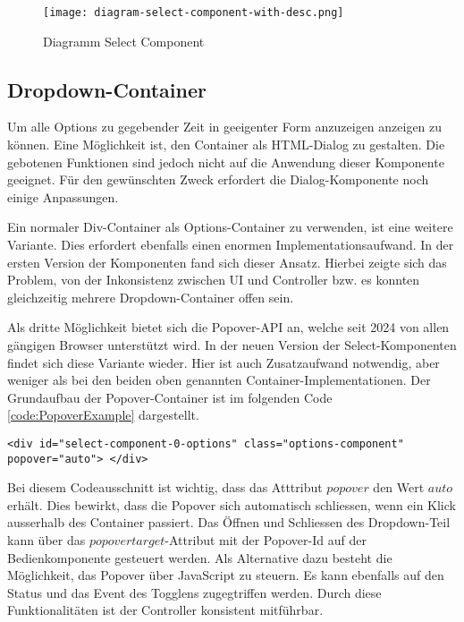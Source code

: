 \begin{figure}[!htb]
    \centering
    \texttt{[image: diagram-select-component-with-desc.png]}
    \caption{Diagramm Select Component}
    \label{Abbildung:DiagramSelectComponent}
\end{figure}


\subsection{Dropdown-Container}

Um alle Options zu gegebender Zeit in geeigenter Form anzuzeigen anzeigen zu können.
Eine Möglichkeit ist, den Container als HTML-Dialog zu gestalten.
Die gebotenen Funktionen sind jedoch nicht auf die Anwendung dieser Komponente geeignet.
Für den gewünschten Zweck erfordert die Dialog-Komponente noch einige Anpassungen.

Ein normaler Div-Container als Options-Container zu verwenden, ist eine weitere Variante.
Dies erfordert ebenfalls einen enormen Implementationsaufwand.
In der ersten Version der Komponenten fand sich dieser Ansatz.
Hierbei zeigte sich das Problem, von der Inkonsistenz zwischen UI und Controller bzw. es konnten gleichzeitig mehrere Dropdown-Container offen sein.

Als dritte Möglichkeit bietet sich die Popover-API an, welche seit 2024 von allen gängigen Browser unterstützt wird.
In der neuen Version der Select-Komponenten findet sich diese Variante wieder.
Hier ist auch Zusatzaufwand notwendig, aber weniger als bei den beiden oben genannten Container-Implementationen.
Der Grundaufbau der Popover-Container ist im folgenden Code \ref{code:PopoverExample} dargestellt.

\begin{lstlisting}[language = html5, caption = Popover-Container Beispiel, label = code:PopoverExample]
<div id="select-component-0-options" class="options-component" popover="auto"> </div>
\end{lstlisting}

Bei diesem Codeausschnitt ist wichtig, dass das Atttribut $popover$ den Wert $auto$ erhält.
Dies bewirkt, dass die Popover sich automatisch schliessen, wenn ein Klick ausserhalb des Container passiert.
Das Öffnen und Schliessen des Dropdown-Teil kann über das $popovertarget$-Attribut mit der Popover-Id auf der Bedienkomponente gesteuert werden.
Als Alternative dazu besteht die Möglichkeit, das Popover über JavaScript zu steuern.
Es kann ebenfalls auf den Status und das Event des Togglens zugegtriffen werden.
Durch diese Funktionalitäten ist der Controller konsistent mitführbar.


